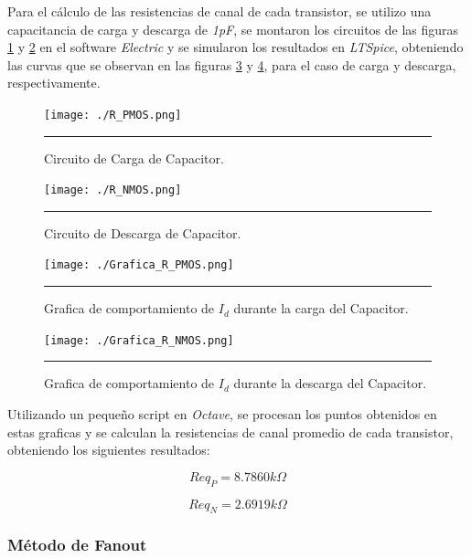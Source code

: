 \documentclass[12pt,a4paper]{article} %
\begin{document}
Para el cálculo de las resistencias de canal de cada transistor, se utilizo una capacitancia de carga y descarga de \textit{1pF}, se montaron los circuitos de las figuras \ref{fig:R_PMOS} y \ref{fig:R_NMOS} en el software \textit{Electric} y se simularon los resultados en  \textit{LTSpice}, obteniendo las curvas que se observan en las figuras \ref{fig:Grafica_R_PMOS} y \ref{fig:Grafica_R_NMOS}, para el caso de carga y descarga, respectivamente.\\

\begin{figure}[htbp]
  \centering
    \texttt{[image: ./R\_PMOS.png]}
    \rule{35em}{0.3pt}
  \caption[C_Carga]{Circuito de Carga de Capacitor.}
  \label{fig:R_PMOS}
\end{figure}

\begin{figure}[htbp]
  \centering
  	\texttt{[image: ./R\_NMOS.png]}
    \rule{35em}{0.3pt}
  \caption[C_Descarga]{Circuito de Descarga de Capacitor.}
  \label{fig:R_NMOS}
\end{figure}

\begin{figure}[htbp]
  \centering
    \texttt{[image: ./Grafica\_R\_PMOS.png]}
   \rule{35em}{0.3pt}
  \caption[G_Carga]{Grafica de comportamiento de $\textit{I}_{\textit{d}}$ durante la carga del Capacitor.}
  \label{fig:Grafica_R_PMOS}
\end{figure}

\begin{figure}[htbp]
 \centering
    \texttt{[image: ./Grafica\_R\_NMOS.png]}
    \rule{35em}{0.3pt}
  \caption[G_Descarga]{Grafica de comportamiento de $\textit{I}_{\textit{d}}$ durante la descarga del Capacitor.}
  \label{fig:Grafica_R_NMOS}
\end{figure}

Utilizando un pequeño script en \textit{Octave}, se procesan los puntos obtenidos en estas graficas y se calculan la resistencias de canal promedio de cada transistor, obteniendo los siguientes resultados:

\begin{equation}\label{eqn:R_PMOS}
Req_P = 8.7860k\Omega
\end{equation}

\begin{equation}\label{eqn:R_NMOS}
Req_N = 2.6919k\Omega
\end{equation}

\subsubsection{Método de Fanout}
\end{document}
